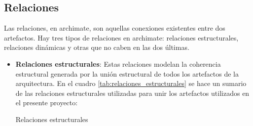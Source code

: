 \subsection{Relaciones}

Las relaciones, en archimate, son aquellas conexiones existentes entre dos artefactos. Hay tres tipos de relaciones en archimate: relaciones estructurales, relaciones dinámicas y otras que no caben en las dos últimas.

\begin{itemize}

\item \textbf{Relaciones estructurales}: Estas relaciones modelan la coherencia estructural generada por la unión estructural de todos los artefactos de la arquitectura. En el cuadro \ref{tab:relaciones_estructurales} se hace un sumario de las relaciones estructurales utilizadas para unir los artefactos utilizados en el presente proyecto:

\begin{table}
  \caption{Relaciones estructurales}
  \label{tab:relaciones_estructurales}

  \begin{center}
  

\end{center}
\end{table}
\end{itemize}
